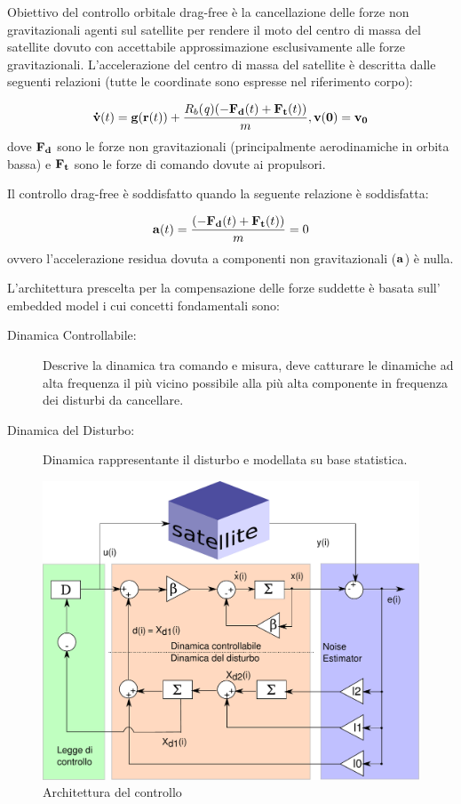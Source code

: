 Obiettivo del controllo orbitale drag-free è la cancellazione delle forze non
gravitazionali agenti sul satellite per rendere il moto del centro di massa del
satellite dovuto con accettabile approssimazione esclusivamente alle forze
gravitazionali. L'accelerazione del centro di massa del satellite è descritta
dalle seguenti relazioni (tutte le coordinate sono espresse nel riferimento
corpo):

\begin{equation}
\mathbf{\dot{v}}(t) = \mathbf{g}(\mathbf{r}(t))+
\frac{R_b(\mathit{q})(-\mathbf{F_d}(t)+\mathbf{F_t}(t))}{m},
\mathbf{v(0)=v_	0}
\end{equation}
dove $\mathbf{F_d}$ sono le forze non gravitazionali (principalmente
aerodinamiche in orbita bassa) e $\mathbf{F_t}$ sono le forze di comando
dovute ai propulsori.

Il controllo drag-free è soddisfatto quando la seguente relazione è soddisfatta:

\begin{equation}
\mathbf{a}(t) = \frac{(- \mathbf{F_d}(t) + \mathbf{F_t}(t))}{m}=0
\end{equation}
ovvero l'accelerazione residua dovuta a componenti non gravitazionali
($\mathbf{a}$) è nulla.

L'architettura prescelta per la compensazione delle forze suddette è basata 
sull' embedded model i cui concetti fondamentali sono:
\begin{description}
\item[Dinamica Controllabile:] Descrive la dinamica tra comando e misura, deve
catturare le dinamiche ad alta frequenza il più vicino possibile alla più alta
componente in frequenza dei disturbi da cancellare.
\item[Dinamica del Disturbo:] Dinamica rappresentante il disturbo e modellata su
base statistica.
\end{description} 

\begin{figure}
\includegraphics[width=\textwidth]{control/orbit_control/images/block-diagram.pdf}
\caption{Architettura del controllo}
\end{figure}

